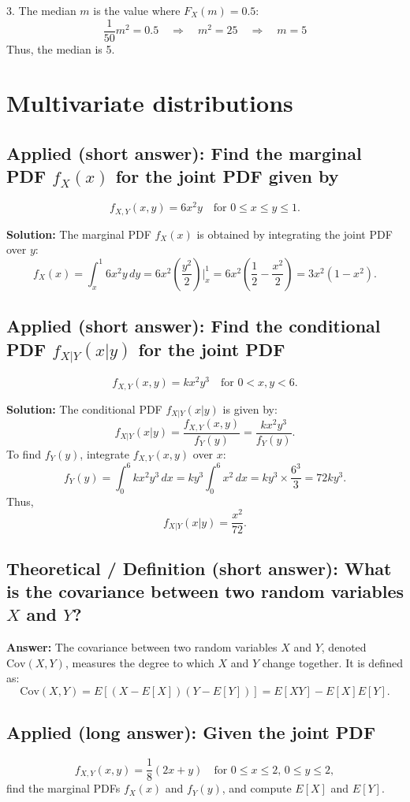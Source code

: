 \documentclass[12pt]{article}
\begin{document}
3. The median \( m \) is the value where \( F_X(m) = 0.5 \):
\[
\frac{1}{50} m^2 = 0.5 \quad \Rightarrow \quad m^2 = 25 \quad \Rightarrow \quad m = 5
\]
Thus, the median is 5.



\section{Multivariate distributions}

\subsection{Applied (short answer): Find the marginal PDF \( f_X(x) \) for the joint PDF given by}
\[
f_{X,Y}(x, y) = 6x^2 y \quad \text{for } 0 \leq x \leq y \leq 1.
\]

\textbf{Solution:} The marginal PDF \( f_X(x) \) is obtained by integrating the joint PDF over \( y \):
\[
f_X(x) = \int_x^1 6x^2 y \, dy = 6x^2 \left( \frac{y^2}{2} \right) \Bigg|_x^1 = 6x^2 \left( \frac{1}{2} - \frac{x^2}{2} \right) = 3x^2 (1 - x^2).
\]

\subsection{Applied (short answer): Find the conditional PDF \( f_{X|Y}(x|y) \) for the joint PDF}
\[
f_{X,Y}(x, y) = k x^2 y^3 \quad \text{for } 0 < x, y < 6.
\]

\textbf{Solution:} The conditional PDF \( f_{X|Y}(x|y) \) is given by:
\[
f_{X|Y}(x|y) = \frac{f_{X,Y}(x, y)}{f_Y(y)} = \frac{k x^2 y^3}{f_Y(y)}.
\]
To find \( f_Y(y) \), integrate \( f_{X,Y}(x, y) \) over \( x \):
\[
f_Y(y) = \int_0^6 k x^2 y^3 \, dx = k y^3 \int_0^6 x^2 \, dx = k y^3 \times \frac{6^3}{3} = 72k y^3.
\]
Thus,
\[
f_{X|Y}(x|y) = \frac{x^2}{72}.
\]

\subsection{Theoretical / Definition (short answer): What is the covariance between two random variables \( X \) and \( Y \)?}

\textbf{Answer:} The covariance between two random variables \( X \) and \( Y \), denoted \( \text{Cov}(X, Y) \), measures the degree to which \( X \) and \( Y \) change together. It is defined as:
\[
\text{Cov}(X, Y) = E[(X - E[X])(Y - E[Y])] = E[XY] - E[X]E[Y].
\]

\subsection{Applied (long answer): Given the joint PDF}
\[
f_{X,Y}(x, y) = \frac{1}{8} (2x + y) \quad \text{for } 0 \leq x \leq 2, \, 0 \leq y \leq 2,
\]
find the marginal PDFs \( f_X(x) \) and \( f_Y(y) \), and compute \( E[X] \) and \( E[Y] \).
\end{document}
